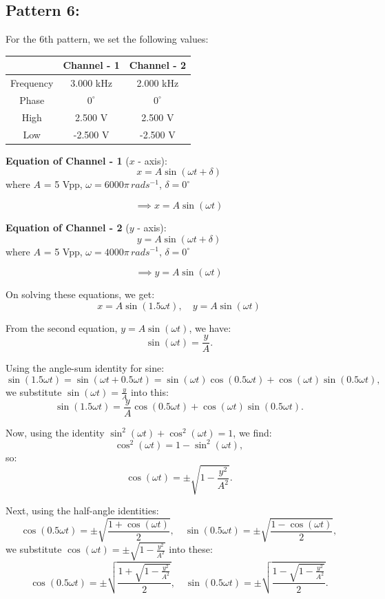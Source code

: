 \documentclass[12pt]{article}
\begin{document}
\subsection{Pattern 6:}
For the 6th pattern, we set the following values:
\begin{table}[H]
    \centering
    \begin{tabular}{|c|c|c|}
    \hline
        & \textbf{Channel - 1} & \textbf{Channel - 2}\\
    \hline
    Frequency & 3.000 kHz & 2.000 kHz\\
    \hline
    Phase     & $0^{\circ}$ & $0^{\circ}$\\
    \hline
    High      & 2.500 V & 2.500 V\\
    \hline
    Low       & -2.500 V & -2.500 V\\
    \hline
    \end{tabular}
\end{table}

\textbf{Equation of Channel - 1} ($x$ - axis):
\[
x = A \sin{\left(\omega t + \delta\right)}
\]
where $A$ = 5 Vpp, $\omega = 6000 \pi \, rad s^{-1}$, $\delta = 0^{\circ}$

\[
\implies x = A \sin{\left(\omega t\right)}
\]

\textbf{Equation of Channel - 2} ($y$ - axis):
\[
y = A \sin{\left(\omega t + \delta\right)}
\]
where $A$ = 5 Vpp, $\omega = 4000 \pi \, rad s^{-1}$, $\delta = 0^{\circ}$

\[
\implies y = A \sin{\left(\omega t\right)}
\]

On solving these equations, we get:
\[
x = A \sin{\left(1.5\omega t\right)}, \quad y = A \sin{\left(\omega t\right)}
\]

From the second equation, \( y = A \sin(\omega t) \), we have:
\[
\sin(\omega t) = \frac{y}{A}.
\]

Using the angle-sum identity for sine:
\[
\sin(1.5\omega t) = \sin(\omega t + 0.5\omega t) = \sin(\omega t)\cos(0.5\omega t) + \cos(\omega t)\sin(0.5\omega t),
\]
we substitute \( \sin(\omega t) = \frac{y}{A} \) into this:
\[
\sin(1.5\omega t) = \frac{y}{A}\cos(0.5\omega t) + \cos(\omega t)\sin(0.5\omega t).
\]

Now, using the identity \( \sin^2(\omega t) + \cos^2(\omega t) = 1 \), we find:
\[
\cos^2(\omega t) = 1 - \sin^2(\omega t),
\]
so:
\[
\cos(\omega t) = \pm \sqrt{1 - \frac{y^2}{A^2}}.
\]

Next, using the half-angle identities:
\[
\cos(0.5\omega t) = \pm \sqrt{\frac{1 + \cos(\omega t)}{2}}, \quad \sin(0.5\omega t) = \pm \sqrt{\frac{1 - \cos(\omega t)}{2}},
\]
we substitute \( \cos(\omega t) = \pm \sqrt{1 - \frac{y^2}{A^2}} \) into these:
\[
\cos(0.5\omega t) = \pm \sqrt{\frac{1 + \sqrt{1 - \frac{y^2}{A^2}}}{2}}, \quad \sin(0.5\omega t) = \pm \sqrt{\frac{1 - \sqrt{1 - \frac{y^2}{A^2}}}{2}}.
\]
\end{document}
